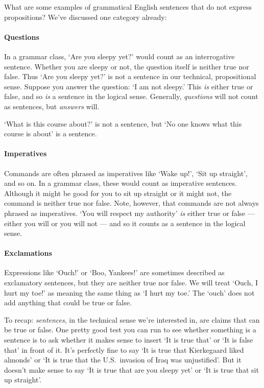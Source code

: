 What are some examples of grammatical English sentences that do not express propositions? We've discussed one category already:

\paragraph{Questions} In a grammar class, `Are you sleepy yet?' would count as an interrogative sentence. Whether you are sleepy or not, the question itself is neither true nor false. Thus `Are you sleepy yet?' is not a sentence in our technical, propositional sense. Suppose you answer the question: `I am not sleepy.' This \emph{is} either true or false, and so \emph{is} a sentence in the logical sense. Generally, \emph{questions} will not count as sentences, but \emph{answers} will. 

`What is this course about?' is not a sentence, but `No one knows what this course is about' is a sentence.

\paragraph{Imperatives} Commands are often phrased as imperatives like `Wake up!', `Sit up straight', and so on. In a grammar class, these would count as imperative sentences. Although it might be good for you to sit up straight or it might not, the command is neither true nor false. Note, however, that commands are not always phrased as imperatives. `You will respect my authority' \emph{is} either true or false --- either you will or you will not --- and so it counts as a sentence in the logical sense.

\paragraph{Exclamations} Expressions like `Ouch!' or `Boo, Yankees!' are sometimes described as exclamatory sentences, but they are neither true nor false. We will treat `Ouch, I hurt my toe!' as meaning the same thing as `I hurt my toe.' The `ouch' does not add anything that could be true or false.

To recap: \emph{sentences}, in the technical sense we're interested in, are claims that can be true or false. One pretty good test you can run to see whether something is a sentence is to ask whether it makes sense to insert `It is true that' or `It is false that' in front of it. It's perfectly fine to say `It is true that Kierkegaard liked almonds' or `It is true that the U.S.\ invasion of Iraq was unjustified'. But it doesn't make sense to say `It is true that are you sleepy yet' or `It is true that sit up straight'.






